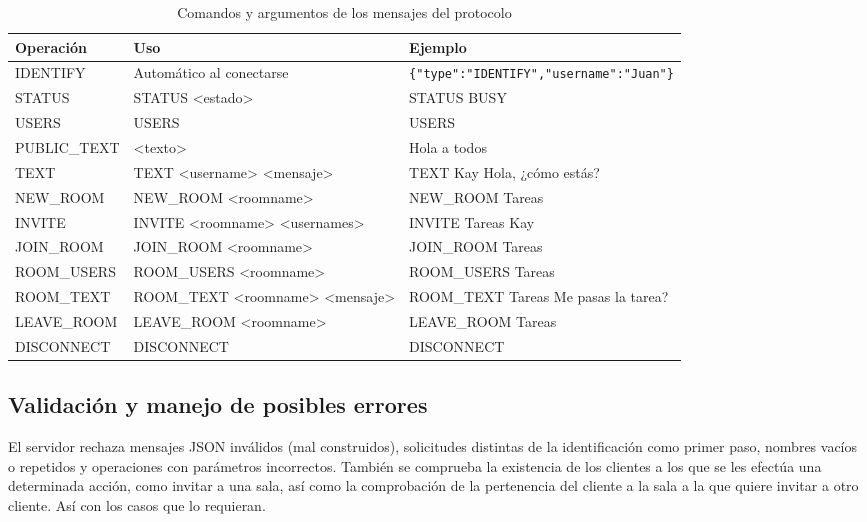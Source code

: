 \documentclass[12pt,a4paper]{article}
\begin{document}
\begin{table}[ht]
    \centering
    \caption{Comandos y argumentos de los mensajes del protocolo}
    \label{tab:argumentos}
    \begin{tabular}{|l|p{6cm}|p{6cm}|}
        \hline
        \textbf{Operación} & \textbf{Uso} & \textbf{Ejemplo} \\
        \hline
        IDENTIFY & Automático al conectarse & \texttt{\{"type":"IDENTIFY","username":"Juan"\}} \\
        \hline
        STATUS & STATUS <estado> & STATUS BUSY \\
        \hline
        USERS & USERS & USERS \\
        \hline
        PUBLIC\_TEXT & <texto> & Hola a todos \\
        \hline
        TEXT & TEXT <username> <mensaje> & TEXT Kay Hola, ¿cómo estás? \\
        \hline
        NEW\_ROOM & NEW\_ROOM <roomname> & NEW\_ROOM Tareas \\
        \hline
        INVITE & INVITE <roomname> <usernames> & INVITE Tareas Kay \\
        \hline
        JOIN\_ROOM & JOIN\_ROOM <roomname> & JOIN\_ROOM Tareas \\
        \hline
        ROOM\_USERS & ROOM\_USERS <roomname> & ROOM\_USERS Tareas \\
        \hline
        ROOM\_TEXT & ROOM\_TEXT <roomname> <mensaje> & ROOM\_TEXT Tareas Me pasas la tarea? \\
        \hline
        LEAVE\_ROOM & LEAVE\_ROOM <roomname> & LEAVE\_ROOM Tareas \\
        \hline
        DISCONNECT & DISCONNECT & DISCONNECT \\
        \hline
    \end{tabular}
\end{table}

\subsection*{Validación y manejo de posibles errores}
El servidor rechaza mensajes JSON inválidos (mal construidos), solicitudes
distintas de la identificación como primer paso, nombres vacíos o repetidos
y operaciones con parámetros incorrectos. También se comprueba la existencia
de los clientes a los que se les efectúa una determinada acción, como invitar
a una sala, así como la comprobación de la pertenencia del cliente a la sala
a la que quiere invitar a otro cliente. Así con los casos que lo requieran.
\end{document}
